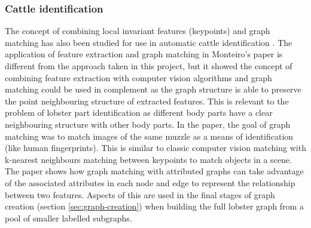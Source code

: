 \subsubsection{Cattle identification} \label{sec:cattle}
The concept of combining local invariant features (keypoints) and graph matching has also been studied for use in automatic cattle identification \cite{cattle}. The application of feature extraction and graph matching in Monteiro's paper is different from the approach taken in this project, but it showed the concept of combining feature extraction with computer vision algorithms and graph matching could be used in complement as the graph structure is able to preserve the point neighbouring structure of extracted features. This is relevant to the problem of lobster part identification as different body parts have a clear neighbouring structure with other body parts.
\n
In the paper, the goal of graph matching was to match images of the same muzzle as a means of identification (like human fingerprints). This is similar to classic computer vision matching with k-nearest neighbours matching between keypoints to match objects in a scene. The paper shows how graph matching with attributed graphs can take advantage of the associated attributes in each node and edge to represent the relationship between two features. Aspects of this are used in the final stages of graph creation (section \ref{sec:graph-creation}) when building the full lobster graph from a pool of smaller labelled subgraphs. 

